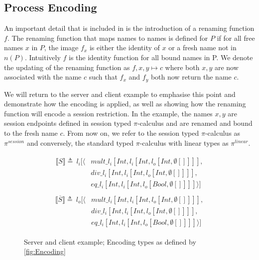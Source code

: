 \subsection{Process Encoding}

An important detail that is included in \citep{dardha2017session} is the introduction of a renaming function $f$. The renaming function that maps names to names is defined for $P$ if for all free names $x$ in $P$, the image $f_x$ is either the identity of $x$ or a fresh name not in $n(P)$. Intuitively $f$ is the identity function for all bound names in P. We denote the updating of the renaming function as $f, {x, y \mapsto c}$ where both $x, y$ are now associated with the name $c$ such that $f_x$ and $f_y$ both now return the name $c$. 

We will return to the server and client example to emphasise this point and demonstrate how the encoding is applied, as well as showing how the renaming function will encode a session restriction. In the example, the names $x, y$ are session endpoints defined in session typed $\pi$-calculus and are renamed and bound to the fresh name $c$. From now on, we refer to the session typed $\pi$-calculus as $\pi^{session}$ and conversely, the standard typed $\pi$-calculus with linear types as $\pi^{linear}$.

\begin{figure}[h]
    \centering
    \begin{align*}
        \begin{split}
            \llbracket S \rrbracket \triangleq \: l_i[\langle & mult\_l_i[Int, l_i[Int, l_o[Int, \emptyset[]]]],\\
            & div\_l_i[Int, l_i[Int, l_o[Int, \emptyset[]]]],\\
            & eq\_l_i[Int, l_i[Int, l_o[Bool, \emptyset[]]]] \rangle ] 
        \end{split}
    \end{align*}
    \begin{align*}
        \begin{split}
            \llbracket \overline{S} \rrbracket \triangleq \: l_o[\langle & mult\_l_i[Int, l_i[Int, l_o[Int, \emptyset[]]]],\\
            & div\_l_i[Int, l_i[Int, l_o[Int, \emptyset[]]]],\\
            & eq\_l_i[Int, l_i[Int, l_o[Bool, \emptyset[]]]] \rangle ] 
        \end{split}
    \end{align*}
    \caption{Server and client example; Encoding types as defined by \autoref{fig:Encoding}}
    \label{fig:my_label}
\end{figure}

